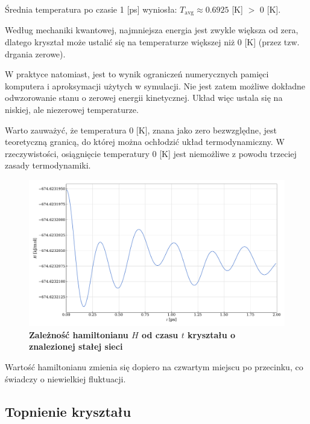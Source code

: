 \documentclass[11pt,a4paper]{article}
\begin{document}
Średnia temperatura po czasie 1 [ps] wyniosła: $T_{\text{avg}}\approx0.6925$ [K] $>$ 0 [K]. 

Według mechaniki kwantowej, najmniejsza energia jest zwykle większa od zera, dlatego kryształ może ustalić się na temperaturze większej niż 0 [K] (przez tzw. drgania zerowe).

W praktyce natomiast, jest to wynik ograniczeń numerycznych pamięci komputera i aproksymacji użytych w symulacji. Nie jest zatem możliwe dokładne odwzorowanie stanu o zerowej energii kinetycznej. Układ więc ustala się na niskiej, ale niezerowej temperaturze.

Warto zauważyć, że temperatura 0 [K], znana jako zero bezwzględne, jest teoretyczną granicą, do której można ochłodzić układ termodynamiczny. W rzeczywistości, osiągnięcie temperatury 0 [K] jest niemożliwe z powodu trzeciej zasady termodynamiki.

\begin{figure}[ht!]
    \caption{\textbf{Zależność hamiltonianu $H$ od czasu $t$ kryształu o znalezionej stałej sieci}}
    \vspace{0.2cm}
    \includegraphics[width=\linewidth]{../figures/crystal_stability.pdf}
\end{figure}
\pagebreak

Wartość hamiltonianu zmienia się dopiero na czwartym miejscu po przecinku, co świadczy o niewielkiej fluktuacji.

\subsection{Topnienie kryształu}
\end{document}
